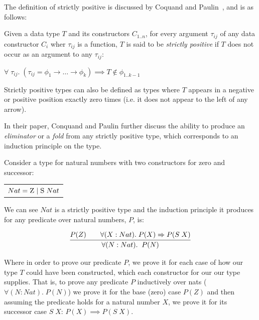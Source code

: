 The definition of strictly positive is discussed by Coquand and Paulin~\cite{CoquandTypes}, and is as follows:

\theoremstyle{definition}
\begin{definition}
    \label{def:sp}
    Given a data type $T$ and its constructors $C_{1..n}$, for every argument $\tau_{ij}$
    of any data constructor $C_i$ wher $\tau_{ij}$ is a function, $T$ is said to be \textit{strictly positive} if 
    $T$ does not occur as an argument to any $\tau_{ij}$:

    \begin{center}
        $\forall\; \tau_{ij}.\;
        (\tau_{ij} = \phi_{1} \rightarrow \dots \rightarrow \phi_{k})
        \implies T \notin \phi_{1..k-1}$
    \end{center}
\end{definition}

Strictly positive types can also be defined as types where $T$ appears in a negative or positive 
position exactly zero times (i.e. it does not appear to the left of any arrow).

In their paper, Conquand and Paulin further discuss the ability to produce an \textit{eliminator} or a
\textit{fold} from any strictly positive type, which corresponds to an induction principle on the type.

Consider a type for natural numbers with two constructors for zero and successor:

\begin{center}
    \begin{tabular}{l}
        $Nat = \textsc{Z}\; \vert\; \textsc{S}\; Nat$ \\
    \end{tabular} 
\end{center}

We can see $Nat$ is a strictly positive type and the induction principle it produces
for any predicate over natural numbers, $P$, is:

\[
    \infer{
        \forall(N : Nat).\;\; P(N)
    }{
        P(Z) \quad & \forall (X : Nat).\; P(X) \implies P(S\; X)
    }
\]

Where in order to prove our predicate $P$, we prove it for each case of how our type $T$ could have been
constructed, which each constructor for our our type supplies.
That is, to prove any predicate $P$ inductively over nats ($\forall(N : Nat).\; P(N)$)
we prove it for the base (zero) case $P(Z)$ and then assuming the predicate holds
for a natural number $X$, we prove it for its successor case $S\; X$: $P(X) \implies P(S\; X)$.

